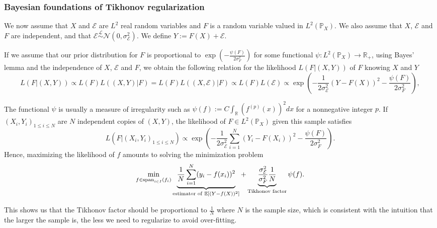 \documentclass[a4paper]{article}
\def\simdist{\stackrel{\mathcal{L}}{\sim}}
\newcommand{\1}{\textbf{1}}
\newcommand{\R}{\mathbb{R}}
\newcommand{\E}{\mathbb{E}}
\newcommand{\PP}{\mathbb{P}}
\newcommand{\sspan}{\operatorname{span}}
\begin{document}
\subsubsection*{Bayesian foundations of Tikhonov regularization}
\par We now assume that $X$ and $\mathcal{E}$ are $L^2$ real random variables and $F$ is a random variable valued in $L^2(\PP_X)$. We also assume that $X$, $\mathcal{E}$ and $F$ are independent, and that $\mathcal{E} \simdist \mathcal{N}(0, \sigma_{\mathcal{E}}^2)$. We define $Y := F(X) + {\mathcal{E}}$. 
\par \noindent If we assume that our prior distribution for $F$ is proportional to $\exp\left(- \frac{\psi(F)}{2 \sigma_F^2}\right)$ for some functional $\psi: L^2(\PP_X) \to \R_+$, using Bayes' lemma and the independence of $X$, $\mathcal{E}$ and $F$, we obtain the following relation for the likelihood $L(F|(X,Y))$ of $F$ knowing $X$ and $Y$
$$
L(F | (X, Y)) \propto L(F) L( (X,Y) | F ) = L(F) L( (X, \mathcal{E}) | F ) \propto L(F) L(\mathcal{E}) \propto \exp\left(-\frac{1}{2 \sigma_{\mathcal{E}}^2} \left(Y-F(X) \right)^2 - \frac{\psi(F)}{2 \sigma_F^2}\right),
$$
\par \noindent The functional $\psi$ is usually a measure of irregularity such as $\psi(f) := C \int_\R \left(f^{(p)}(x)\right)^2 dx$ for a nonnegative integer $p$. If $(X_i, Y_i)_{1 \leq i \leq N}$ are $N$ independent copies of $(X,Y)$, the likelihood of $F \in L^2(\PP_X)$ given this sample satisfies
$$
L(F | (X_i, Y_i)_{1 \leq i \leq N}) \propto \exp\left(-\frac{1}{2 \sigma_{\mathcal{E}}^2} \sum\limits_{i = 1}^N \left(Y_i-F(X_i) \right)^2 - \frac{\psi(F)}{2 \sigma_F^2}\right). 
$$
Hence, maximizing the likelihood of $f$ amounts to solving the minimization problem
\begin{equation}\label{eq:first_tikho}
\min\limits_{f \in \sspan\limits_{i \in I} (f_i)} \underbrace{\frac{1}{N} \sum\limits_{i=1}^N (y_i - f(x_i))^2}_{\textnormal{estimator of} \ \E\left[(Y-f(X))^2\right]} + \underbrace{\frac{\sigma_{\mathcal{E}}^2}{\sigma_F^2} \frac{1}{N}}_{\textnormal{Tikhonov factor}} \psi(f).
\end{equation}
\par \noindent This shows us that the Tikhonov factor should be proportional to $\frac{1}{N}$ where $N$ is the sample size, which is consistent with the intuition that the larger the sample is, the less we need to regularize to avoid over-fitting.
\end{document}
